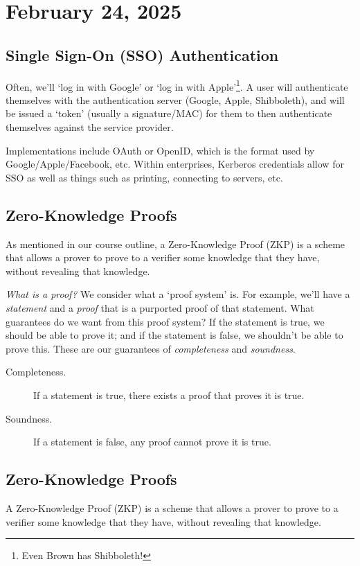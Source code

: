 \section{February 24, 2025}
\label{20250224}

\subsection{Single Sign-On (SSO) Authentication}
Often, we'll `log in with Google' or `log in with Apple'\footnote{Even Brown has Shibboleth!}. A user will authenticate themselves with the authentication server (Google, Apple, Shibboleth), and will be issued a `token' (usually a signature/MAC) for them to then authenticate themselves against the service provider.

Implementations include OAuth or OpenID, which is the format used by Google/Apple/Facebook, etc. Within enterprises, Kerberos credentials allow for SSO as well as things such as printing, connecting to servers, etc.


\subsection{Zero-Knowledge Proofs}
As mentioned in our course outline, a Zero-Knowledge Proof (ZKP) is a scheme that allows a prover to prove to a verifier some knowledge that they have, without revealing that knowledge.

\emph{What is a proof?} We consider what a `proof system' is. For example, we'll have a \emph{statement} and a \emph{proof} that is a purported proof of that statement. What guarantees do we want from this proof system? If the statement is true, we should be able to prove it; and if the statement is false, we shouldn't be able to prove this. These are our guarantees of \emph{completeness} and \emph{soundness}.
\begin{description}
    \item[Completeness.] If a statement is true, there exists a proof that proves it is true.
    \item[Soundness.] If a statement is false, any proof cannot prove it is true.
\end{description}

\subsection{Zero-Knowledge Proofs}
A Zero-Knowledge Proof (ZKP) is a scheme that allows a prover to prove to a verifier some knowledge that they have, without revealing that knowledge.

